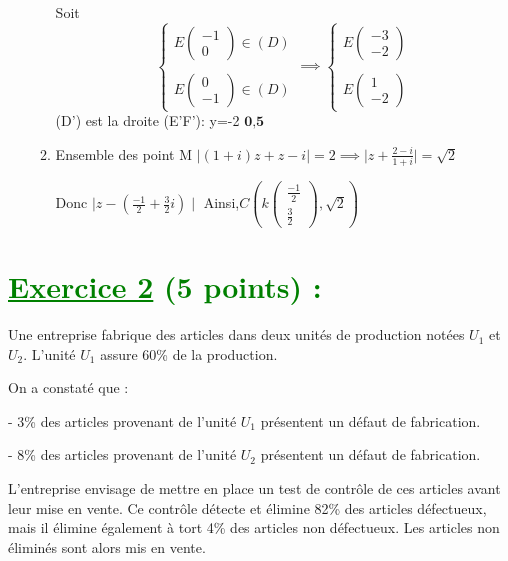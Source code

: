 \documentclass[12pt]{article}
\begin{document}
\begin{enumerate}
\begin{enumerate}
Soit  
\[
\begin{cases}
E\begin{pmatrix} -1 \\ 
0\end{pmatrix}\in (D)\\ \\
E\begin{pmatrix} 0 \\ -1\end{pmatrix}\in (D)
\end{cases} \implies 
\begin{cases}
E\begin{pmatrix} -3 \\ -2\end{pmatrix}\\ \\
E\begin{pmatrix} 1 \\ -2\end{pmatrix}
\end{cases}
\]
(D') est la droite (E'F'): y=-2 $\textbf{0,5}$
\item Ensemble des point M
$\mid (1+i)z+z-i\mid=2 \implies \mid z+\frac{2-i}{1+i}\mid=\sqrt{2}$

Donc $\mid z-(\frac{-1}{2}+\frac{3}{2}i)\mid$ Ainsi,$ C\left( k\begin{pmatrix} \frac{-1}{2} \\ \frac{3}{2}\end{pmatrix}, \sqrt{2}\right) $
\end{enumerate}
\end{enumerate}


\section*{\textcolor{green}{\underline{Exercice 2} (5 points) :}}

Une entreprise fabrique des articles dans deux unités de production notées \( U_1 \) et \( U_2 \). L’unité \( U_1 \) assure 60\% de la production.

On a constaté que :

- 3\% des articles provenant de l’unité \( U_1 \) présentent un défaut de fabrication.

- 8\% des articles provenant de l’unité \( U_2 \) présentent un défaut de fabrication.

L’entreprise envisage de mettre en place un test de contrôle de ces articles avant leur mise en vente. Ce contrôle détecte et élimine 82\% des articles défectueux, mais il élimine également à tort 4\% des articles non défectueux. Les articles non éliminés sont alors mis en vente.
\end{document}
